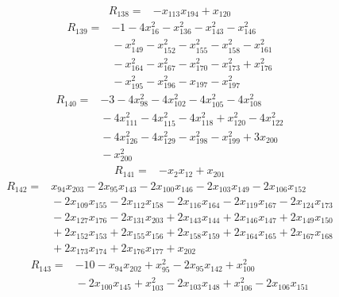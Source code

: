 {\begin{align*}
\end{align*}
\begin{align*}
R_{138} ={}& -x_{113} x_{194} + x_{120}
\end{align*}
\begin{align*}
R_{139} ={}& -1 - 4x_{16}^{2} - x_{136}^{2} - x_{143}^{2} - x_{146}^{2} \\
&{}  - x_{149}^{2} - x_{152}^{2} - x_{155}^{2} - x_{158}^{2} - x_{161}^{2} \\
&{}  - x_{164}^{2} - x_{167}^{2} - x_{170}^{2} - x_{173}^{2} + x_{176}^{2} \\
&{}  - x_{195}^{2} - x_{196}^{2} - x_{197} - x_{197}^{2}
\end{align*}
\begin{align*}
R_{140} ={}& -3 - 4x_{98}^{2} - 4x_{102}^{2} - 4x_{105}^{2} - 4x_{108}^{2} \\
&{}  - 4x_{111}^{2} - 4x_{115}^{2} - 4x_{118}^{2} + x_{120}^{2} - 4x_{122}^{2} \\
&{}  - 4x_{126}^{2} - 4x_{129}^{2} - x_{198}^{2} - x_{199}^{2} + 3x_{200} \\
&{}  - x_{200}^{2}
\end{align*}
\begin{align*}
R_{141} ={}& -x_{2} x_{12} + x_{201}
\end{align*}
\begin{align*}
R_{142} ={}& x_{94} x_{203} - 2x_{95} x_{143} - 2x_{100} x_{146} - 2x_{103} x_{149} - 2x_{106} x_{152} \\
&{}  - 2x_{109} x_{155} - 2x_{112} x_{158} - 2x_{116} x_{164} - 2x_{119} x_{167} - 2x_{124} x_{173} \\
&{}  - 2x_{127} x_{176} - 2x_{131} x_{203} + 2x_{143} x_{144} + 2x_{146} x_{147} + 2x_{149} x_{150} \\
&{}  + 2x_{152} x_{153} + 2x_{155} x_{156} + 2x_{158} x_{159} + 2x_{164} x_{165} + 2x_{167} x_{168} \\
&{}  + 2x_{173} x_{174} + 2x_{176} x_{177} + x_{202}
\end{align*}
\begin{align*}
R_{143} ={}& -10 - x_{94} x_{202} + x_{95}^{2} - 2x_{95} x_{142} + x_{100}^{2} \\
&{}  - 2x_{100} x_{145} + x_{103}^{2} - 2x_{103} x_{148} + x_{106}^{2} - 2x_{106} x_{151} \\

\end{align*}}
